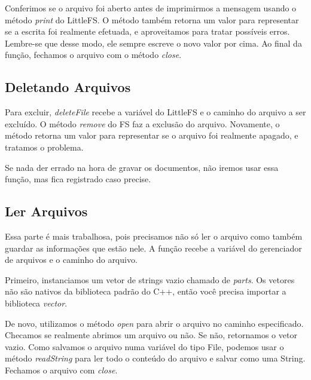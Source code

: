 \documentclass[12pt]{article}
\begin{document}
Conferimos se o arquivo foi aberto antes de imprimirmos a mensagem usando o método \textit{print} do LittleFS. O método também retorna um valor para representar se a escrita foi realmente efetuada, e aproveitamos para tratar possíveis erros. Lembre-se que desse modo, ele sempre escreve o novo valor por cima. Ao final da função, fechamos o arquivo com o método \textit{close}.



\subsection{Deletando Arquivos}



Para excluir, \textit{deleteFile} recebe a variável do LittleFS e o caminho do arquivo a ser excluído. O método \textit{remove} do FS faz a exclusão do arquivo. Novamente, o método retorna um valor para representar se o arquivo foi realmente apagado, e tratamos o problema.



Se nada der errado na hora de gravar os documentos, não iremos usar essa função, mas fica registrado caso precise.

\subsection{Ler Arquivos}



Essa parte é mais trabalhosa, pois precisamos não só ler o arquivo como também guardar as informações que estão nele. A função recebe a variável do gerenciador de arquivos e o caminho do arquivo.

Primeiro, instanciamos um vetor de strings vazio chamado de \textit{parts}. Os vetores não são nativos da biblioteca padrão do C++, então você precisa importar a biblioteca \textit{vector}.

 \newpage

De novo, utilizamos o método \textit{open} para abrir o arquivo no caminho especificado. Checamos se realmente abrimos um arquivo ou não. Se não, retornamos o vetor vazio. Como salvamos o arquivo numa variável do tipo File, podemos usar o método \textit{readString} para ler todo o conteúdo do arquivo e salvar como uma String. Fechamos o arquivo com \textit{close}.
\end{document}

